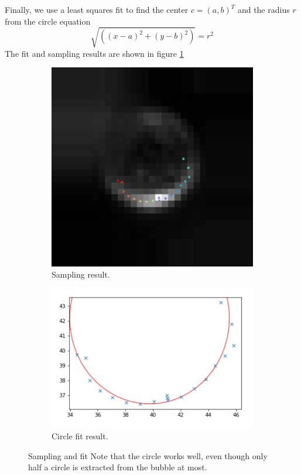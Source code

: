 				
				Finally, we use a least squares fit to find the center $c = (a,b)^T$ and the radius $r$ from the circle equation
				\begin{equation}
					\sqrt{ \left( (x-a)^2 + (y-b)^2 \right)} = r^2
				\end{equation}
				The fit and sampling results are shown in figure \ref{fig:fit_circle_fit_result}
				
				\begin{figure}
				
					\begin{subfigure}[t]{.50\textwidth}
						\centering
						\includegraphics[scale=.8]{images/sampling_result.png}
						\caption{Sampling result. }
					\end{subfigure}					
					\begin{subfigure}[t]{.55\textwidth}
						\centering
						\includegraphics[scale=.7]{graphs/circle_fit.png}
						\caption{Circle fit result.}
					\end{subfigure}
					
					
					\caption{Sampling and fit Note that the circle works well, even though only half a circle is extracted from the bubble at most. }
					\label{fig:fit_circle_fit_result}
				\end{figure}



